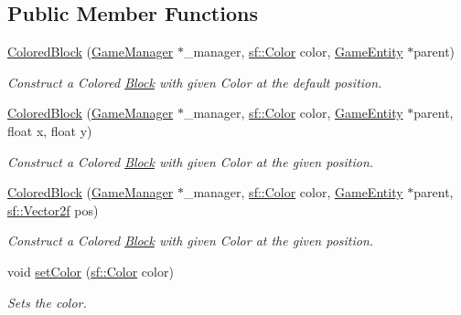 \subsection*{Public Member Functions}
\begin{DoxyCompactItemize}
\item 
\mbox{\hyperlink{class_colored_block_a79be4d3936cf71a57df1466131e17e38}{Colored\+Block}} (\mbox{\hyperlink{class_game_manager}{Game\+Manager}} $\ast$\+\_\+manager, \mbox{\hyperlink{classsf_1_1_color}{sf\+::\+Color}} color, \mbox{\hyperlink{class_game_entity}{Game\+Entity}} $\ast$parent)
\begin{DoxyCompactList}\small\item\em Construct a Colored \mbox{\hyperlink{class_block}{Block}} with given Color at the default position. \end{DoxyCompactList}\item 
\mbox{\hyperlink{class_colored_block_afb308406bb24c63657dbe0697e4fb40c}{Colored\+Block}} (\mbox{\hyperlink{class_game_manager}{Game\+Manager}} $\ast$\+\_\+manager, \mbox{\hyperlink{classsf_1_1_color}{sf\+::\+Color}} color, \mbox{\hyperlink{class_game_entity}{Game\+Entity}} $\ast$parent, float x, float y)
\begin{DoxyCompactList}\small\item\em Construct a Colored \mbox{\hyperlink{class_block}{Block}} with given Color at the given position. \end{DoxyCompactList}\item 
\mbox{\hyperlink{class_colored_block_a52df8c86d732fbadf3d913227dfd011b}{Colored\+Block}} (\mbox{\hyperlink{class_game_manager}{Game\+Manager}} $\ast$\+\_\+manager, \mbox{\hyperlink{classsf_1_1_color}{sf\+::\+Color}} color, \mbox{\hyperlink{class_game_entity}{Game\+Entity}} $\ast$parent, \mbox{\hyperlink{classsf_1_1_vector2}{sf\+::\+Vector2f}} pos)
\begin{DoxyCompactList}\small\item\em Construct a Colored \mbox{\hyperlink{class_block}{Block}} with given Color at the given position. \end{DoxyCompactList}\item 
void \mbox{\hyperlink{class_colored_block_a7df0fe6e6a760e5dff3a84de6571384c}{set\+Color}} (\mbox{\hyperlink{classsf_1_1_color}{sf\+::\+Color}} color)
\begin{DoxyCompactList}\small\item\em Sets the color. \end{DoxyCompactList}\item 

\end{DoxyCompactItemize}

